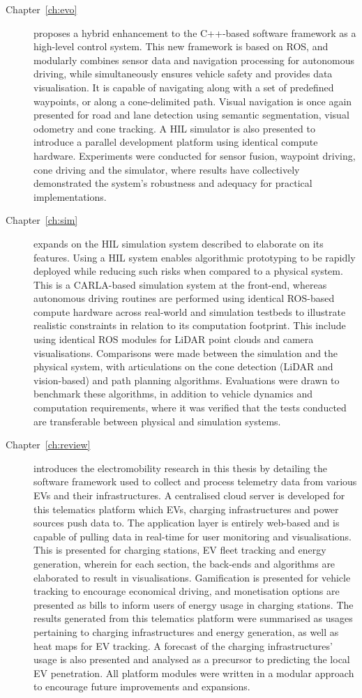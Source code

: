 \begin{description}
	\item [Chapter~\ref{ch:evo}] proposes a hybrid enhancement to the C++-based software framework as a high-level control system. This new framework is based on ROS, and modularly combines sensor data and navigation processing for autonomous driving, while simultaneously ensures vehicle safety and provides data visualisation. %
	It is capable of navigating along with a set of predefined waypoints, or along a cone-delimited path. Visual navigation is once again presented for road and lane detection using semantic segmentation, visual odometry and cone tracking. A HIL simulator is also presented to introduce a parallel development platform using identical compute hardware. Experiments were conducted for sensor fusion, waypoint driving, cone driving and the simulator, where results have collectively demonstrated the system's robustness and adequacy for practical implementations. 
	\item [Chapter~\ref{ch:sim}] expands on the HIL simulation system described to elaborate on its features. Using a HIL system enables algorithmic prototyping to be rapidly deployed while reducing such risks when compared to a physical system. This is a CARLA-based simulation system at the front-end, whereas autonomous driving routines are performed using identical ROS-based compute hardware across real-world and simulation testbeds to illustrate realistic constraints in relation to its computation footprint. This include using identical ROS modules for LiDAR point clouds and camera visualisations. Comparisons were made between the simulation and the physical system, with articulations on the cone detection (LiDAR and vision-based) and path planning algorithms. Evaluations were drawn to benchmark these algorithms, in addition to vehicle dynamics and computation requirements, where it was verified that the tests conducted are transferable between physical and simulation systems.
	\item [Chapter~\ref{ch:review}] introduces the electromobility research in this thesis by detailing the software framework used to collect and process telemetry data from various EVs and their infrastructures. A centralised cloud server is developed for this telematics platform which EVs, charging infrastructures and power sources push data to. The application layer is entirely web-based and is capable of pulling data in real-time for user monitoring and visualisations. This is presented for charging stations, EV fleet tracking and energy generation, wherein for each section, the back-ends and algorithms are elaborated to result in visualisations. Gamification is presented for vehicle tracking to encourage economical driving, and monetisation options are presented as bills to inform users of energy usage in charging stations. The results generated from this telematics platform were summarised as usages pertaining to charging infrastructures and energy generation, as well as heat maps for EV tracking. A forecast of the charging infrastructures' usage is also presented and analysed as a precursor to predicting the local EV penetration. All platform modules were written in a modular approach to encourage future improvements and expansions.  

\end{description}
